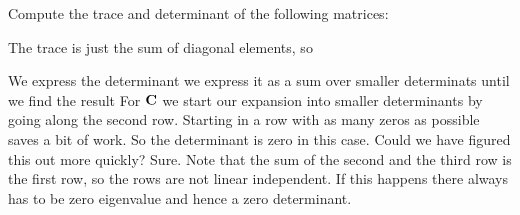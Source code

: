 
Compute the trace and determinant of the following matrices: 

\solution

The trace is just the sum of diagonal elements, so

We express the determinant we express it as a sum over smaller determinats until we find the result 
For ${\bf C}$ we start our expansion into smaller determinants by going along the second row. Starting in a row with as many zeros as possible saves a bit of work. 
So the determinant is zero in this case. Could we have figured this out more quickly? Sure. Note that the sum of the second and the third row is the first row, so the rows are not linear independent. If this happens there always has to be zero eigenvalue and hence a zero determinant. 
